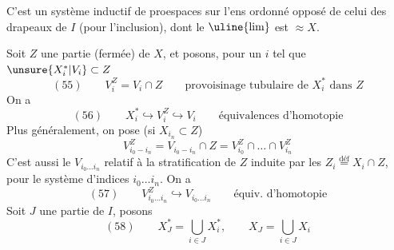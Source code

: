 C'est un système inductif de  proespaces
sur l'ens ordonné opposé de celui des drapeaux de $I$
(pour l'inclusion), dont le $\uline{\lim}$ est  $\approx X$.

Soit $Z$  une partie (fermée)
de $X$, et posons, pour \deleted{$\unsure{\forall}$} un $i$ tel que
$\unsure{X_i^*|V_i}\subset Z$
\[
(55)\qquad V_i^Z=V_i\cap Z\qquad
\text{provoisinage tubulaire de }X_i^*\text{ dans }Z
\]
On a
\[
(56)\qquad X_i^*\hookrightarrow V_i^Z\hookrightarrow V_i
\qquad\text{équivalences d'homotopie}
\]
Plus généralement, on pose (si $X_{i_n}\subset Z$)
\[
V_{i_0-i_n}^Z=V_{i_0-i_n}\cap Z
=V_{i_0}^Z\cap\ldots\cap V_{i_n}^Z
\]
C'est aussi le $V_{i_0\ldots i_n}$ relatif à la 
stratification de $Z$ induite par les
$Z_i\overset{\mathrm{déf}}{=}X_i\cap Z$, pour le système d'indices
$i_0\ldots i_n$. On a
\[
(57)\qquad V_{i_0\ldots i_n}^Z\hookrightarrow V_{i_0\ldots i_n}
\qquad\text{équiv. d'homotopie}
\]
Soit $J$ une partie de $I$, posons
\[
(58)\qquad X_J^*=\bigcup_{i\in J}X_i^*,\qquad X_J=\bigcup_{i\in J}X_i
\]

